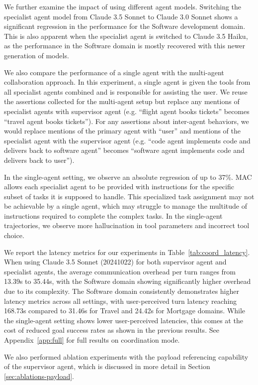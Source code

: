 We further examine the impact of using different agent models. Switching the specialist agent model from Claude 3.5 Sonnet  to Claude 3.0 Sonnet shows a significant regression in the performance for the Software development domain. This is also apparent when the specialist agent is switched to Claude 3.5 Haiku, as the performance in the Software domain is mostly recovered with this newer generation of models.

We also compare the performance of a single agent with the multi-agent collaboration approach. In this experiment, a single agent is given the tools from all specialist agents combined and is responsible for assisting the user. We reuse the assertions collected for the multi-agent setup but replace any mentions of specialist agents with supervisor agent (e.g. ``flight agent books tickets'' becomes ``travel agent books tickets''). For any assertions about inter-agent behaviors, we would replace mentions of the primary agent with ``user'' and mentions of the specialist agent with the supervisor agent (e.g. ``code agent implements code and delivers back to software agent'' becomes ``software agent implements code and delivers back to user'').  

In the single-agent setting, we observe an absolute regression of up to 37\%. MAC allows each specialist agent to be provided with instructions for the specific subset of tasks it is supposed to handle. This specialized task assignment may not be achievable by a single agent, which may struggle to manage the multitude of instructions required to complete the complex tasks. In the single-agent trajectories, we observe more hallucination in tool parameters and incorrect tool choice. 



We report the latency metrics for our experiments in Table~\ref{tab:coord_latency}. When using Claude 3.5 Sonnet (20241022) for both supervisor agent and specialist agents, the average communication overhead per turn ranges from 13.39s to 35.44s, with the Software domain showing significantly higher overhead due to its complexity. The Software domain consistently demonstrates higher latency metrics across all settings, with user-perceived turn latency reaching 168.73s compared to 31.46s for Travel and 24.42s for Mortgage domains. While the single-agent setting shows lower user-perceived latencies, this comes at the cost of reduced goal success rates as shown in the previous results. See Appendix~\ref{app:full} for full results on coordination mode.

We also performed ablation experiments with the payload referencing capability of the supervisor agent, which is discussed in more detail in Section \ref{sec:ablations-payload}.